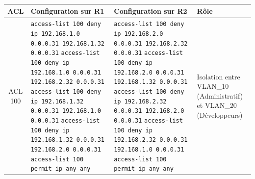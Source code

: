 \documentclass[12pt,a4paper, oneside]{memoir}
\begin{document}
\begin{landscape}
\begin{table}[]
	\centering
	\renewcommand{\arraystretch}{1.3}
	\begin{tabular}{|c|p{8cm}|p{8cm}|p{5cm}|}
		\hline
		\textbf{ACL} & \textbf{Configuration sur R1} & \textbf{Configuration sur R2} & \textbf{Rôle} \\
		\hline
		
		ACL 100 &
		\texttt{access-list 100 deny ip 192.168.1.0 0.0.0.31 192.168.1.32 0.0.0.31} \newline \newline
		\texttt{access-list 100 deny ip 192.168.1.0 0.0.0.31 192.168.2.32 0.0.0.31} \newline \newline		
		\texttt{access-list 100 deny ip 192.168.1.32 0.0.0.31 192.168.1.0 0.0.0.31} \newline \newline
		\texttt{access-list 100 deny ip 192.168.1.32 0.0.0.31 192.168.2.0 0.0.0.31} \newline \newline		
		\texttt{access-list 100 permit ip any any}
		&
		\texttt{access-list 100 deny ip 192.168.2.0 0.0.0.31 192.168.2.32 0.0.0.31} \newline \newline
		\texttt{access-list 100 deny ip 192.168.2.0 0.0.0.31 192.168.1.32 0.0.0.31} \newline \newline
		\texttt{access-list 100 deny ip 192.168.2.32 0.0.0.31 192.168.2.0 0.0.0.31} \newline \newline
		\texttt{access-list 100 deny ip 192.168.2.32 0.0.0.31 192.168.1.0 0.0.0.31} \newline \newline
		\texttt{access-list 100 permit ip any any}
		&
		Isolation entre VLAN\_10 (Administratif) et VLAN\_20 (Développeurs)
		\\
		\hline
		

\end{tabular}
\end{table}
\end{landscape}
\end{document}
